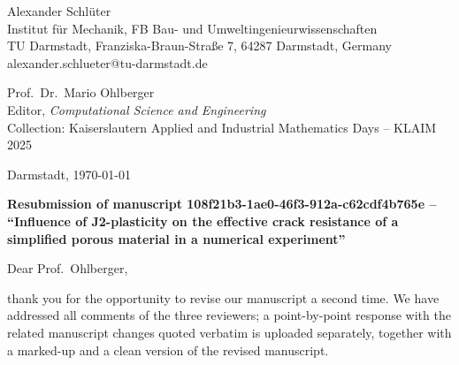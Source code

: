 \documentclass[11pt]{article}
\begin{document}
\noindent Alexander Schl\"uter\\
Institut f\"ur Mechanik, FB Bau- und Umweltingenieurwissenschaften\\
TU Darmstadt, Franziska-Braun-Stra{\ss}e 7, 64287 Darmstadt, Germany\\
alexander.schlueter@tu-darmstadt.de

\vspace{4mm}
\noindent Prof.\ Dr.\ Mario Ohlberger\\
Editor, \emph{Computational Science and Engineering}\\
Collection: Kaiserslautern Applied and Industrial Mathematics Days -- KLAIM 2025

\vspace{4mm}
\noindent Darmstadt, \today

\vspace{4mm}
\noindent \textbf{Resubmission of manuscript 108f21b3-1ae0-46f3-912a-c62cdf4b765e --
``Influence of J2-plasticity on the effective crack resistance of a simplified porous material in a numerical experiment''}

\vspace{4mm}
\noindent Dear Prof.\ Ohlberger,

thank you for the opportunity to revise our manuscript a second time. We have addressed all comments of the three
reviewers; a point-by-point response with the related manuscript changes quoted verbatim is uploaded separately, together
with a marked-up and a clean version of the revised manuscript.
\end{document}

